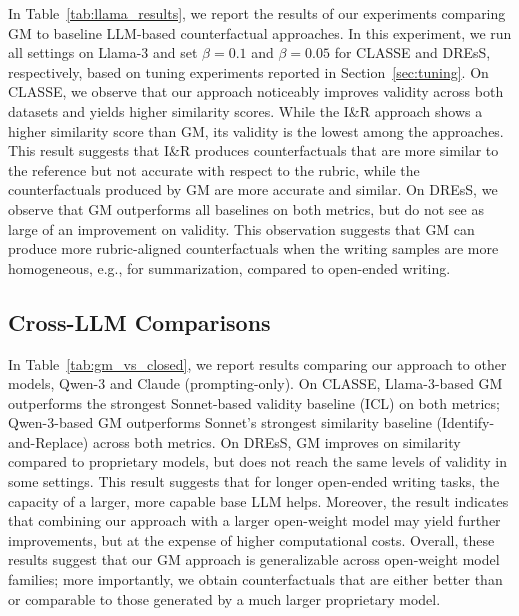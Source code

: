 \documentclass[letterpaper]{article} %
\begin{document}
In Table~\ref{tab:llama_results}, we report the results of our experiments comparing GM to baseline LLM-based counterfactual approaches. In this experiment, we run all settings on Llama-3 and set $\beta=0.1$ and $\beta=0.05$ for CLASSE and DREsS, respectively, based on tuning experiments reported in Section~\ref{sec:tuning}. On CLASSE, we observe that our approach noticeably improves validity across both datasets and yields higher similarity scores. While the I\&R approach shows a higher similarity score than GM, its validity is the lowest among the approaches. This result suggests that I\&R produces counterfactuals that are more similar to the reference but not accurate with respect to the rubric, while the counterfactuals produced by GM are more accurate and similar. On DREsS, we observe that GM outperforms all baselines on both metrics, but do not see as large of an improvement on validity. This observation suggests that GM can produce more rubric-aligned counterfactuals when the writing samples are more homogeneous, e.g., for summarization, compared to open-ended writing. 


\subsection{Cross-LLM Comparisons}

In Table~\ref{tab:gm_vs_closed}, we report results comparing our approach to other models, Qwen-3 and Claude (prompting-only). 
On CLASSE, Llama-3-based GM outperforms the strongest Sonnet-based validity baseline (ICL) on both metrics; Qwen-3-based GM outperforms Sonnet's strongest similarity baseline (Identify-and-Replace) across both metrics. On DREsS, GM improves on similarity compared to proprietary models, but does not reach the same levels of validity in some settings. This result suggests that for longer open-ended writing tasks, the capacity of a larger, more capable base LLM helps. 
Moreover, the result indicates that combining our approach with a larger open-weight model may yield further improvements, but at the expense of higher computational costs. Overall, these results suggest that our GM approach is generalizable across open-weight model families; more importantly, we obtain counterfactuals that are either better than or comparable to those generated by a much larger proprietary model.
\end{document}
